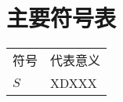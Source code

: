 \chapter*{\hfill 主要符号表 \hfill}\label{chap:00}

\begin{table*}[htbp]
  \centering
  \vspace{0.2cm}
  \zhongwu
\begin{tabular}{p{5cm}p{5cm}}
  \toprule
符号&代表意义\\
$S$&XDXXX\\
 \bottomrule
\end{tabular}
\end{table*}
